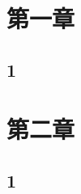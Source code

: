 \documentclass{CCNUthesis}
\begin{document}
  \tableofcontents
  \chapter{第一章}
  \section{1}
  \chapter{第二章}
  \section{1}
\end{document}
